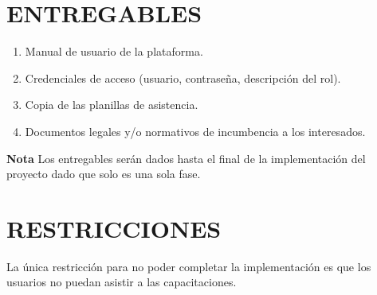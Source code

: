 \chapter{ENTREGABLES}
%
\begin{enumerate}
	\item Manual de usuario de la plataforma.
	\item Credenciales de acceso (usuario, contrase\~na, descripci\'on del rol).
	\item Copia de las planillas de asistencia.
	\item Documentos legales y/o normativos de incumbencia a los interesados.
\end{enumerate}
\textbf{Nota} Los entregables ser\'an dados hasta el final de la implementaci\'on del proyecto dado que solo 
es una sola fase.%

\chapter{RESTRICCIONES}
%
La \'unica restricci\'on para no poder completar la implementaci\'on es que los usuarios no puedan asistir
a las capacitaciones.%